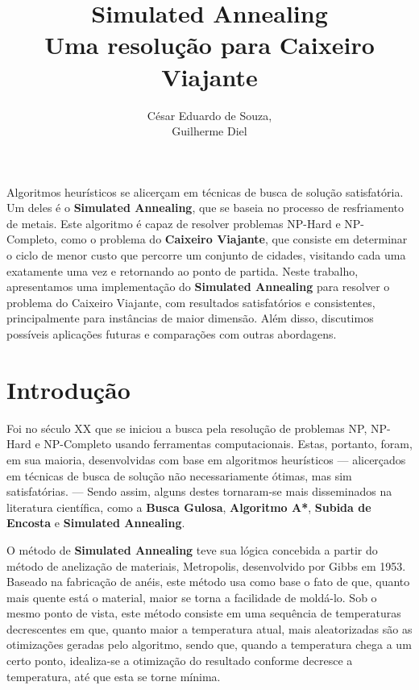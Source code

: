 \documentclass[12pt]{article}
\title{Simulated Annealing\\ Uma resolução para Caixeiro Viajante}
\author{César Eduardo de Souza\inst{1},\\ Guilherme Diel\inst{1}}
\begin{document}
 

\maketitle

     
\begin{resumo} 
  Algoritmos heurísticos se alicerçam em técnicas de busca de solução satisfatória. Um deles é o \textbf{Simulated Annealing}, que se baseia no processo de resfriamento de metais. Este algoritmo é capaz de resolver problemas NP-Hard e NP-Completo, como o problema do \textbf{Caixeiro Viajante}, que consiste em determinar o ciclo de menor custo que percorre um conjunto de cidades, visitando cada uma exatamente uma vez e retornando ao ponto de partida. Neste trabalho, apresentamos uma implementação do \textbf{Simulated Annealing} para resolver o problema do Caixeiro Viajante, com resultados satisfatórios e consistentes, principalmente para instâncias de maior dimensão. Além disso, discutimos possíveis aplicações futuras e comparações com outras abordagens.
\end{resumo}


\section{Introdução}
\label{sec:introducao}
Foi no século XX que se iniciou a busca pela resolução de problemas NP, NP-Hard e NP-Completo usando ferramentas computacionais. 
%
Estas, portanto, foram, em sua maioria, desenvolvidas com base em algoritmos heurísticos — alicerçados em técnicas de busca de solução não necessariamente ótimas, mas sim satisfatórias. — 
%
Sendo assim, alguns destes tornaram-se mais disseminados na literatura científica, como a \textbf{Busca Gulosa}, \textbf{Algoritmo A*}, \textbf{Subida de Encosta} e \textbf{Simulated Annealing}.

O método de \textbf{Simulated Annealing} teve sua lógica concebida a partir do método de anelização de materiais, Metropolis, desenvolvido por Gibbs em 1953.
%
Baseado na fabricação de anéis, este método usa como base o fato de que, quanto mais quente está o material, maior se torna a facilidade de moldá-lo.%
Sob o mesmo ponto de vista, este método consiste em uma sequência de temperaturas decrescentes em que, quanto maior a temperatura atual, mais aleatorizadas são as otimizações geradas pelo algoritmo, sendo que, quando a temperatura chega a um certo ponto, idealiza-se a otimização do resultado conforme decresce a temperatura, até que esta se torne mínima.
\end{document}
